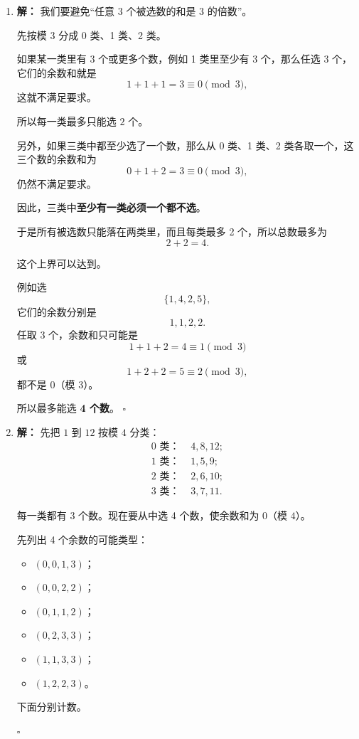 \documentclass[11pt,a4paper,fontset=fandol]{ctexart}
\theoremstyle{formalexample}
\newenvironment{solution}{\par\noindent\textbf{解：}}{\hfill$\square$\par}
\begin{document}
\begin{enumerate}
  \item \begin{solution}
  我们要避免“任意 3 个被选数的和是 $3$ 的倍数”。

  先按模 $3$ 分成 0 类、1 类、2 类。

  如果某一类里有 $3$ 个或更多个数，例如 1 类里至少有 $3$ 个，那么任选 3 个，它们的余数和就是
  \[
  1+1+1=3\equiv 0\pmod 3,
  \]
  这就不满足要求。

  所以每一类最多只能选 $2$ 个。

  另外，如果三类中都至少选了一个数，那么从 0 类、1 类、2 类各取一个，这三个数的余数和为
  \[
  0+1+2=3\equiv 0\pmod 3,
  \]
  仍然不满足要求。

  因此，三类中\textbf{至少有一类必须一个都不选}。

  于是所有被选数只能落在两类里，而且每类最多 2 个，所以总数最多为
  \[
  2+2=4.
  \]

  这个上界可以达到。

  例如选
  \[
  \{1,4,2,5\},
  \]
  它们的余数分别是
  \[
  1,1,2,2.
  \]
  任取 3 个，余数和只可能是
  \[
  1+1+2=4\equiv 1\pmod 3
  \]
  或
  \[
  1+2+2=5\equiv 2\pmod 3,
  \]
  都不是 $0$（模 $3$）。

  所以最多能选 \textbf{4 个数}。
  \end{solution}

  \item \begin{solution}
  先把 $1$ 到 $12$ 按模 $4$ 分类：
  \[
  \begin{aligned}
  0\text{ 类： }&4,8,12;\\
  1\text{ 类： }&1,5,9;\\
  2\text{ 类： }&2,6,10;\\
  3\text{ 类： }&3,7,11.
  \end{aligned}
  \]

  每一类都有 3 个数。现在要从中选 4 个数，使余数和为 $0$（模 $4$）。

  先列出 4 个余数的可能类型：
  \begin{itemize}
    \item $(0,0,1,3)$；
    \item $(0,0,2,2)$；
    \item $(0,1,1,2)$；
    \item $(0,2,3,3)$；
    \item $(1,1,3,3)$；
    \item $(1,2,2,3)$。
  \end{itemize}

  下面分别计数。


\end{solution}
\end{enumerate}
\end{document}
